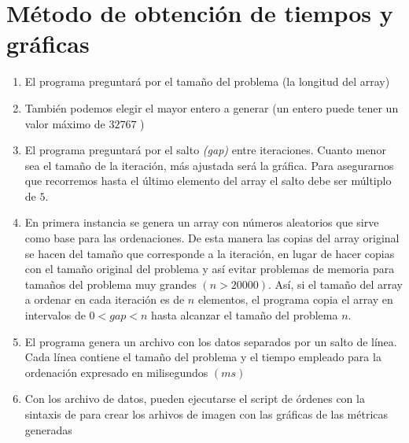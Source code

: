 \section{Método de obtención de tiempos y gráficas}
	\begin{enumerate}
		\item El programa preguntará por el tamaño del problema (la longitud del array)
		\item También podemos elegir el mayor entero a generar (un entero puede tener un valor 				máximo de $32767$ )
		\item El programa preguntará por el salto \emph{(gap)} entre iteraciones.  Cuanto menor 					sea el tamaño de la iteración, más ajustada será la gráfica.  Para asegurarnos que 					recorremos hasta el último elemento del array el salto debe ser múltiplo de $5$.
		\item En primera instancia se genera un array con números aleatorios que sirve como base 					para las ordenaciones.  De esta manera las copias del array original se hacen del 					tamaño que corresponde a la iteración, en lugar de hacer copias con el tamaño original 				del problema y así evitar problemas de memoria para tamaños del problema muy grandes 					$(n > 20000)$.  Así, si el tamaño del array a ordenar en cada iteración es de $n$ 					elementos, el programa copia el array en intervalos de $0 < gap < n$ hasta alcanzar el 				tamaño del problema $n$.
		\item El programa genera un archivo con los datos separados por un salto de línea.  Cada 					línea contiene el tamaño del problema y el tiempo empleado para la ordenación expresado 			en milisegundos $(ms)$
		\item Con los archivo de datos, pueden ejecutarse el script de órdenes con la sintaxis de 				 para crear los arhivos de imagen con las gráficas de las métricas 					generadas 
	\end{enumerate}